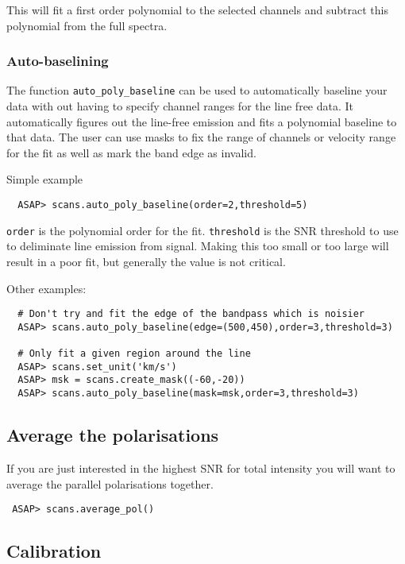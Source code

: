 \documentclass[11pt]{article}
\newcommand{\cmd}[1]{{\tt #1}}
\begin{document}
This will fit a first order polynomial to the selected channels and subtract
this polynomial from the full spectra.

\subsubsection{Auto-baselining}

The function \cmd{auto\_poly\_baseline} can be used to automatically
baseline your data with out having to specify channel ranges for
the line free data. It automatically figures out the line-free
emission and fits a polynomial baseline to that data. The user can use
masks to fix the range of channels or velocity range for the fit as
well as mark the band edge as invalid. 

Simple example

\begin{verbatim}
  ASAP> scans.auto_poly_baseline(order=2,threshold=5)
\end{verbatim}

\cmd{order} is the polynomial order for the fit. \cmd{threshold} is
the SNR threshold to use to deliminate line emission from
signal. Making this too small or too large will result in a poor fit,
but generally the value is not critical.

Other examples:

\begin{verbatim}
  # Don't try and fit the edge of the bandpass which is noisier
  ASAP> scans.auto_poly_baseline(edge=(500,450),order=3,threshold=3)

  # Only fit a given region around the line
  ASAP> scans.set_unit('km/s')
  ASAP> msk = scans.create_mask((-60,-20))
  ASAP> scans.auto_poly_baseline(mask=msk,order=3,threshold=3)

\end{verbatim}

\subsection{Average the polarisations}

If you are just interested in the highest SNR for total intensity you
will want to average the parallel polarisations together.

\begin{verbatim}
 ASAP> scans.average_pol()
\end{verbatim}

\subsection{Calibration}
\end{document}
